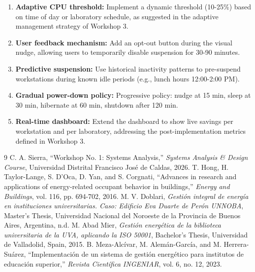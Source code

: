 \documentclass[12pt,a4paper]{article}
\begin{document}
\begin{enumerate}
    \item \textbf{Adaptive CPU threshold:} Implement a dynamic threshold (10-25\%) based on time of day or laboratory schedule, as suggested in the adaptive management strategy of Workshop 3.
    \item \textbf{User feedback mechanism:} Add an opt-out button during the visual nudge, allowing users to temporarily disable suspension for 30-90 minutes.
    \item \textbf{Predictive suspension:} Use historical inactivity patterns to pre-suspend workstations during known idle periods (e.g., lunch hours 12:00-2:00 PM).
    \item \textbf{Gradual power-down policy:} Progressive policy: nudge at 15 min, sleep at 30 min, hibernate at 60 min, shutdown after 120 min.
    \item \textbf{Real-time dashboard:} Extend the dashboard to show live savings per workstation and per laboratory, addressing the post-implementation metrics defined in Workshop 3.
\end{enumerate}

\newpage
\begin{thebibliography}{9}
 C. A. Sierra, ``Workshop No. 1: Systems Analysis,'' \textit{Systems Analysis \& Design Course}, Universidad Distrital Francisco José de Caldas, 2026.
 T. Hong, H. Taylor-Lange, S. D'Oca, D. Yan, and S. Corgnati, ``Advances in research and applications of energy-related occupant behavior in buildings,'' \textit{Energy and Buildings}, vol. 116, pp. 694-702, 2016.
 M. V. Doblari, \textit{Gestión integral de energía en instituciones universitarias. Caso: Edificio Eva Duarte de Perón UNNOBA}, Master's Thesis, Universidad Nacional del Noroeste de la Provincia de Buenos Aires, Argentina, n.d.
 M. Abad Mier, \textit{Gestión energética de la biblioteca universitaria de la UVA, aplicando la ISO 50001}, Bachelor's Thesis, Universidad de Valladolid, Spain, 2015.
 B. Meza-Alcívar, M. Alemán-García, and M. Herrera-Suárez, ``Implementación de un sistema de gestión energético para institutos de educación superior,'' \textit{Revista Científica INGENIAR}, vol. 6, no. 12, 2023.
\end{thebibliography}
\end{document}
